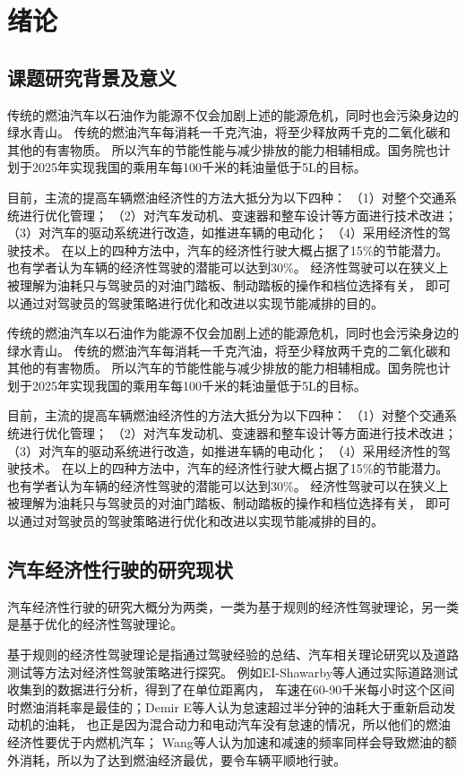 \chapter{绪论}
\section{课题研究背景及意义}
\par  传统的燃油汽车以石油作为能源不仅会加剧上述的能源危机，同时也会污染身边的绿水青山。
传统的燃油汽车每消耗一千克汽油，将至少释放两千克的二氧化碳和其他的有害物质。
所以汽车的节能性能与减少排放的能力相辅相成。国务院也计划于2025年实现我国的乘用车每100千米的耗油量低于5L的目标。

\par  目前，主流的提高车辆燃油经济性的方法大抵分为以下四种：
    （1）对整个交通系统进行优化管理；
    （2）对汽车发动机、变速器和整车设计等方面进行技术改进；
    （3）对汽车的驱动系统进行改造，如推进车辆的电动化；
    （4）采用经济性的驾驶技术。
在以上的四种方法中，汽车的经济性行驶大概占据了15\%的节能潜力。也有学者认为车辆的经济性驾驶的潜能可以达到30\%。
经济性驾驶可以在狭义上被理解为油耗只与驾驶员的对油门踏板、制动踏板的操作和档位选择有关，
即可以通过对驾驶员的驾驶策略进行优化和改进以实现节能减排的目的。

\par  传统的燃油汽车以石油作为能源不仅会加剧上述的能源危机，同时也会污染身边的绿水青山。
传统的燃油汽车每消耗一千克汽油，将至少释放两千克的二氧化碳和其他的有害物质。
所以汽车的节能性能与减少排放的能力相辅相成。国务院也计划于2025年实现我国的乘用车每100千米的耗油量低于5L的目标。

\par  目前，主流的提高车辆燃油经济性的方法大抵分为以下四种：
    （1）对整个交通系统进行优化管理；
    （2）对汽车发动机、变速器和整车设计等方面进行技术改进；
    （3）对汽车的驱动系统进行改造，如推进车辆的电动化；
    （4）采用经济性的驾驶技术。
在以上的四种方法中，汽车的经济性行驶大概占据了15\%的节能潜力。也有学者认为车辆的经济性驾驶的潜能可以达到30\%。
经济性驾驶可以在狭义上被理解为油耗只与驾驶员的对油门踏板、制动踏板的操作和档位选择有关，
即可以通过对驾驶员的驾驶策略进行优化和改进以实现节能减排的目的。

\section{汽车经济性行驶的研究现状}
\par  汽车经济性行驶的研究大概分为两类，一类为基于规则的经济性驾驶理论，另一类是基于优化的经济性驾驶理论。
\par  基于规则的经济性驾驶理论是指通过驾驶经验的总结、汽车相关理论研究以及道路测试等方法对经济性驾驶策略进行探究。
例如EI-Shawarby等人通过实际道路测试收集到的数据进行分析，得到了在单位距离内，
车速在60-90千米每小时这个区间时燃油消耗率是最佳的；Demir E等人认为怠速超过半分钟的油耗大于重新启动发动机的油耗，
也正是因为混合动力和电动汽车没有怠速的情况，所以他们的燃油经济性要优于内燃机汽车；
Wang等人认为加速和减速的频率同样会导致燃油的额外消耗，所以为了达到燃油经济最优，要令车辆平顺地行驶。

